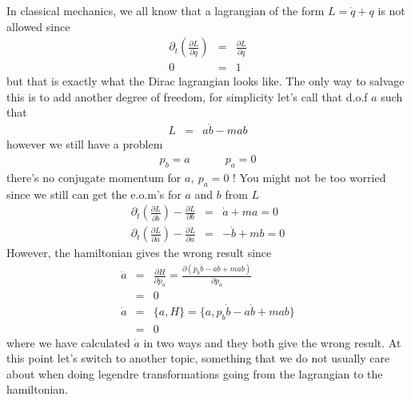 \documentclass[aps,preprint,preprintnumbers,nofootinbib,showpacs,prd]{revtex4-1}
\newcommand{\nbea}{\begin{eqnarray*}}
\newcommand{\neea}{\end{eqnarray*}}
\begin{document}
In classical mechanics, we all know that a lagrangian of the form $L = \dot q + q$ is not allowed since
%
\nbea
\partial_t\left ( \frac{\partial L}{\partial \dot q}\right) & = & \frac{\partial L}{\partial q}\\
0 & = & 1
\neea
%
but that is exactly what the Dirac lagrangian looks like. The only way to salvage this is to add another degree of freedom, for simplicity let's call that d.o.f $a$ such that
%
\nbea
L & = & a\dot b - m ab
\neea
%
however we still have a problem
%
\nbea
p_b = a & ~~~~~~~ & p_a = 0 
\neea
%
there's no conjugate momentum for $a,~p_a = 0$ ! You might not be too worried since we still can get the e.o.m's for $a$ and $b$ from $L$
%
\nbea
\partial_t \left ( \frac{\partial L}{\partial \dot b}\right ) - \frac{\partial L}{\partial b} & = & \dot a + ma = 0 \\
\partial_t \left ( \frac{\partial L}{\partial \dot a}\right ) - \frac{\partial L}{\partial a} & = & -\dot b + mb = 0
\neea
%
However, the hamiltonian gives the wrong result since
%
\nbea
\dot a & = & \frac{\partial H}{\partial p_a} = \frac{\partial(p_b \dot b - a \dot b + mab)}{\partial p_a} \\
& = & 0 \\
\dot a & = & \{a, H\} = \{a,p_b \dot b - a \dot b + mab\} \\
& = & 0
\neea
%
where we have calculated $\dot a$ in two ways and they both give the wrong result. At this point let's switch to another topic, something that we do not usually care about when doing legendre transformations going from the lagrangian to the hamiltonian.
\end{document}
